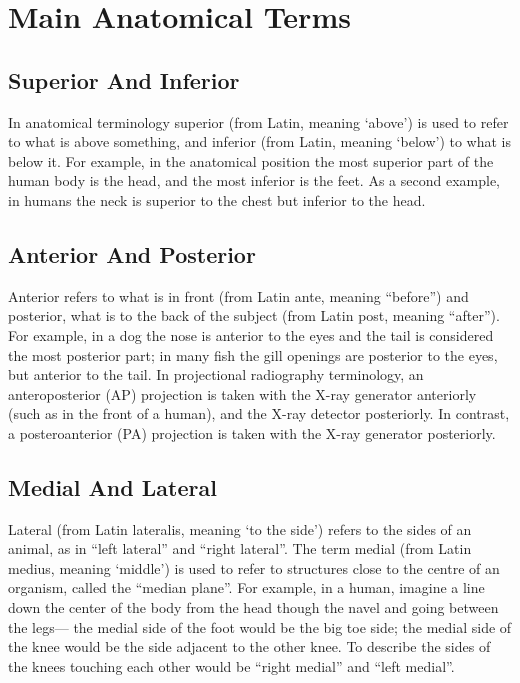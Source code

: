 \hypertarget{main-anatomical-terms}{%
\section{Main Anatomical Terms}\label{main-anatomical-terms}}

\hypertarget{superior-and-inferior}{%
\subsection{Superior And Inferior}\label{superior-and-inferior}}

In anatomical terminology superior (from Latin, meaning `above') is used to refer to what is above something, and inferior (from Latin, meaning `below') to what is below it. For example, in the anatomical position the most superior part of the human body is the head, and the most inferior is the feet. As a second example, in humans the neck is superior to the chest but inferior to the head.

\hypertarget{anterior-and-posterior}{%
\subsection{Anterior And Posterior}\label{anterior-and-posterior}}

Anterior refers to what is in front (from Latin ante, meaning ``before'') and posterior, what is to the back of the subject (from Latin post, meaning ``after''). For example, in a dog the nose is anterior to the eyes and the tail is considered the most posterior part; in many fish the gill openings are posterior to the eyes, but anterior to the tail. In projectional radiography terminology, an anteroposterior (AP) projection is taken with the X-ray generator anteriorly (such as in the front of a human), and the X-ray detector posteriorly. In contrast, a posteroanterior (PA) projection is taken with the X-ray generator posteriorly.

\hypertarget{medial-and-lateral}{%
\subsection{Medial And Lateral}\label{medial-and-lateral}}

Lateral (from Latin lateralis, meaning `to the side') refers to the sides of an animal, as in ``left lateral'' and ``right lateral''. The term medial (from Latin medius, meaning `middle') is used to refer to structures close to the centre of an organism, called the ``median plane''. For example, in a human, imagine a line down the center of the body from the head though the navel and going between the legs--- the medial side of the foot would be the big toe side; the medial side of the knee would be the side adjacent to the other knee. To describe the sides of the knees touching each other would be ``right medial'' and ``left medial''.


